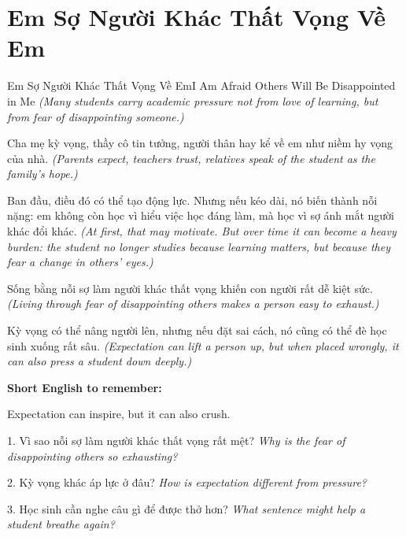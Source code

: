 \section{Em Sợ Người Khác Thất Vọng Về Em}
\begin{truyen}{Em Sợ Người Khác Thất Vọng Về Em}{I Am Afraid Others Will Be Disappointed in Me}
\textit{(Many students carry academic pressure not from love of learning, but from fear of disappointing someone.)}

Cha mẹ kỳ vọng, thầy cô tin tưởng, người thân hay kể về em như niềm hy vọng của nhà.
\textit{(Parents expect, teachers trust, relatives speak of the student as the family's hope.)}

Ban đầu, điều đó có thể tạo động lực. Nhưng nếu kéo dài, nó biến thành nỗi nặng: em không còn học vì hiểu việc học đáng làm, mà học vì sợ ánh mắt người khác đổi khác.
\textit{(At first, that may motivate. But over time it can become a heavy burden: the student no longer studies because learning matters, but because they fear a change in others' eyes.)}

Sống bằng nỗi sợ làm người khác thất vọng khiến con người rất dễ kiệt sức.
\textit{(Living through fear of disappointing others makes a person easy to exhaust.)}
\end{truyen}

\begin{baihoc}
Kỳ vọng có thể nâng người lên, nhưng nếu đặt sai cách, nó cũng có thể đè học sinh xuống rất sâu.
\textit{(Expectation can lift a person up, but when placed wrongly, it can also press a student down deeply.)}
\end{baihoc}

\begin{ghinhoanh}
\textbf{Short English to remember:}

Expectation can inspire, but it can also crush.

\end{ghinhoanh}

\begin{tuhocnhanh}
1. Vì sao nỗi sợ làm người khác thất vọng rất mệt? \textit{Why is the fear of disappointing others so exhausting?}

2. Kỳ vọng khác áp lực ở đâu? \textit{How is expectation different from pressure?}

3. Học sinh cần nghe câu gì để được thở hơn? \textit{What sentence might help a student breathe again?}
\end{tuhocnhanh}
\ngancach

